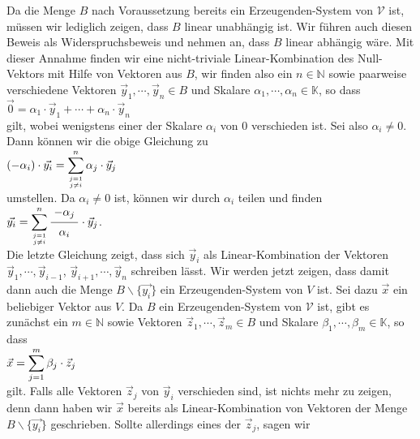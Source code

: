 \proof
Da die Menge $B$ nach Voraussetzung bereits ein Erzeugenden-System von $\mathcal{V}$ ist, m\"{u}ssen wir
lediglich zeigen, dass $B$ linear unabh\"{a}ngig ist.  Wir f\"{u}hren auch diesen Beweis als
Widerspruchsbeweis und nehmen an, dass $B$ linear abh\"{a}ngig w\"{a}re.  Mit dieser Annahme finden wir eine
nicht-triviale Linear-Kombination des Null-Vektors mit Hilfe von Vektoren aus $B$, wir finden also
ein $n \in \mathbb{N}$ sowie paarweise verschiedene Vektoren $\vec{y}_1, \cdots, \vec{y}_n \in B$ und Skalare
$\alpha_1, \cdots, \alpha_n \in \mathbb{K}$, so dass
\\[0.2cm]
\hspace*{1.3cm}
$\vec{0} =  \alpha_1 \cdot \vec{y}_1 + \cdots + \alpha_n \cdot \vec{y}_n$
\\[0.2cm]
gilt, wobei wenigstens einer der Skalare $\alpha_i$ von $0$ verschieden ist.  Sei also $\alpha_i \not= 0$. 
Dann k\"{o}nnen wir die obige Gleichung zu 
\\[0.2cm]
\hspace*{1.3cm}
$\displaystyle(-\alpha_i) \cdot \vec{y_i} = \sum\limits_{j=1 \atop j\not=i}^n \alpha_j \cdot \vec{y}_j$
\\[0.2cm]
umstellen.  Da $\alpha_i \not= 0$ ist, k\"{o}nnen wir durch $\alpha_i$ teilen und finden
\\[0.2cm]
\hspace*{1.3cm}
$\ds \vec{y_i} = \sum\limits_{j=1 \atop j\not=i}^n \bruch{-\alpha_j}{\alpha_i} \cdot \vec{y}_j$.
\\[0.2cm]
Die letzte Gleichung zeigt, dass sich $\vec{y}_i$ als Linear-Kombination der Vektoren
$\vec{y}_1, \cdots, \vec{y}_{i-1}$,  $\vec{y}_{i+1}, \cdots, \vec{y}_n$ schreiben l\"{a}sst.  Wir werden jetzt zeigen, dass damit dann auch die Menge
$B \backslash \{ \vec{y_i} \}$ ein Erzeugenden-System von $V$ ist.  Sei dazu $\vec{x}$ ein
beliebiger Vektor aus $V$.  Da $B$ ein Erzeugenden-System von $\mathcal{V}$ ist, gibt es zun\"{a}chst 
ein $m \in\mathbb{N}$ sowie Vektoren $\vec{z}_1, \cdots, \vec{z}_m \in B$ und Skalare $\beta_1, \cdots,
\beta_m \in \mathbb{K}$, so dass
\\[0.2cm]
\hspace*{1.3cm}
$\displaystyle \vec{x} = \sum\limits_{j=1}^m \beta_j \cdot \vec{z}_j$
\\[0.2cm]
gilt.   Falls alle Vektoren $\vec{z}_j$ von $\vec{y}_i$ verschieden sind,  ist nichts mehr zu
zeigen, denn dann haben wir $\vec{x}$ bereits als Linear-Kombination von Vektoren der Menge $B \backslash \{\vec{y_i}\}$ 
geschrieben.  Sollte allerdings eines der $\vec{z}_j$, sagen wir
